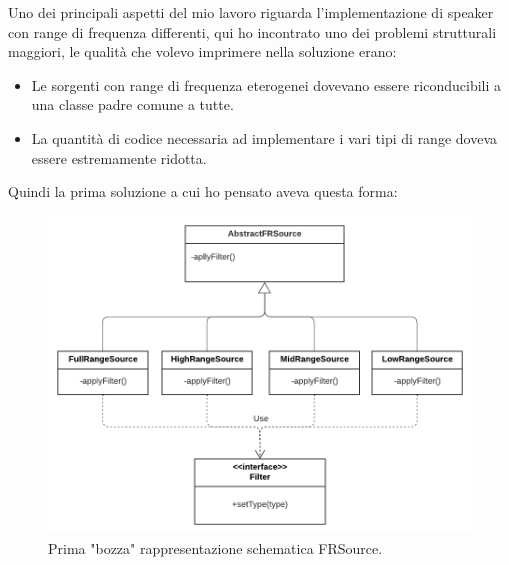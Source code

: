 \documentclass[a4paper,12pt]{report}
\begin{document}
Uno dei principali aspetti del mio lavoro riguarda l'implementazione di speaker con range di frequenza differenti, qui ho incontrato uno dei problemi strutturali maggiori, le qualità che volevo imprimere nella soluzione erano:
\begin{itemize}
	\item Le sorgenti con range di frequenza eterogenei dovevano essere riconducibili a una classe padre comune a tutte.
	\item La quantità di codice necessaria ad implementare i vari tipi di range doveva essere estremamente ridotta.
\end{itemize}
Quindi la prima soluzione a cui ho pensato aveva questa forma:
%
\begin{figure}[H]
\centering{}
\includegraphics[width=\textwidth]{img/source/FRSource(ereditarieta).png}
\caption{Prima "bozza" rappresentazione schematica FRSource.}
\label{img:ereditarietaFRSource}
\end{figure}
\end{document}

